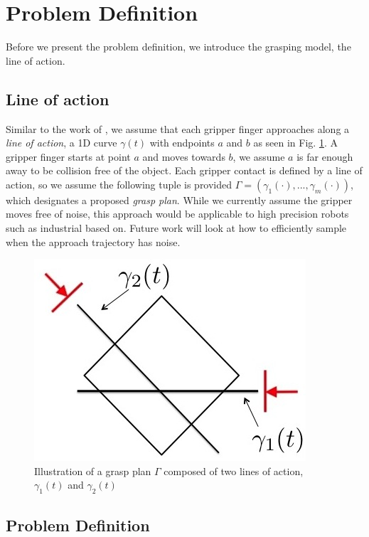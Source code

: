 \documentclass[letterpaper, 10 pt, conference]{ieeeconf}  %
\begin{document}
\section{Problem Definition}
Before we present the problem definition, we introduce the grasping model, the line of action.

\subsection{Line of action}
Similar to the work of \cite{christopoulos2007handling}, we assume that each gripper finger approaches along a \textit{line of action}, a 1D curve $\gamma(t)$ with endpoints $a$ and $b$ as seen in Fig. \ref{fig:line_of_action}.
A gripper finger starts at point $a$ and moves towards $b$, we assume $a$ is far enough away to be collision free of the object.
Each gripper contact is defined by a line of action, so we assume the following tuple is provided $\Gamma = ( \gamma_1(\cdot),...,\gamma_m(\cdot) )$, which designates a proposed \textit{grasp plan}.
While we currently assume the gripper moves free of noise, this approach would be applicable to high precision robots such as industrial based on. 
Future work will look at how to efficiently sample when the approach trajectory has noise. 

\begin{figure}[ht!]
\centering
\includegraphics[scale = 0.3]{figures/Slide01.jpg}
\caption{Illustration of a grasp plan $\Gamma$ composed of two lines of action, $\gamma_1(t)$ and $\gamma_2(t)$}
\vspace*{-10pt}
\label{fig:line_of_action}
\end{figure}

\subsection{Problem Definition}
\end{document}
